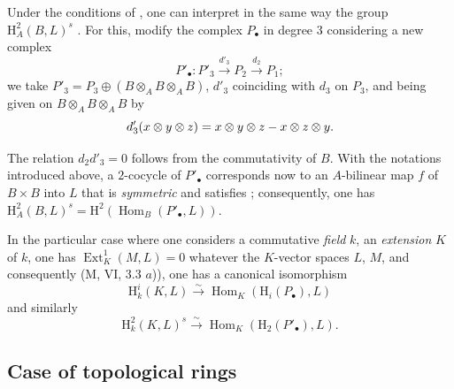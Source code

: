\begin{env}[18.4.5]
\label{0.18.4.5}
Under the conditions of , one can interpret in the same way the group $\mathrm{H}^2_A(B,L)^s$ .
For this, modify the complex $P_\bullet$ in degree $3$ considering a new complex
\[
  P'_\bullet:P'_3\xrightarrow{d'_3}P_2\xrightarrow{d_2}P_1;
\]
we take $P'_3=P_3\oplus(B\otimes_A B\otimes_A B)$, $d'_3$ coinciding with $d_3$ on $P_3$, and being given on $B\otimes_A B\otimes_A B$ by
\[
  d'_3(x\otimes y\otimes z)=x\otimes y\otimes z- x\otimes z\otimes y.
\]

The relation $d_2 d'_3=0$ follows from the commutativity of $B$.
With the notations introduced above, a $2$-cocycle of $P'_\bullet$ corresponds now to an $A$-bilinear map $f$ of $B\times B$ into $L$ that is \emph{symmetric} and satisfies ; consequently, one has $\mathrm{H}^2_A(B,L)^s=\mathrm{H}^2(\operatorname{Hom}_B(P'_\bullet,L))$.
\end{env}

\begin{env}[18.4.6]
\label{0.18.4.6}
In the particular case where one considers a commutative \emph{field} $k$, an \emph{extension} $K$ of $k$, one has $\operatorname{Ext}^1_K(M,L)=0$ whatever the $K$-vector spaces $L$, $M$, and consequently (M, VI, 3.3 $a$)), one has a canonical isomorphism
\begin{equation}
\tag{18.4.6.1}
  \label{0.18.4.6.1}
  \mathrm{H}^i_k(K,L)\xrightarrow{\sim}\operatorname{Hom}_K(\mathrm{H}_i(P_\bullet),L)
\end{equation}
and similarly
\begin{equation}
\tag{18.4.6.2}
  \label{0.18.4.6.2}
  \mathrm{H}^2_k(K,L)^s\xrightarrow{\sim}\operatorname{Hom}_K(\mathrm{H}_2(P'_\bullet),L).
\end{equation}
\end{env}

\subsection{Case of topological rings}
\label{subsection:0.18.5}


